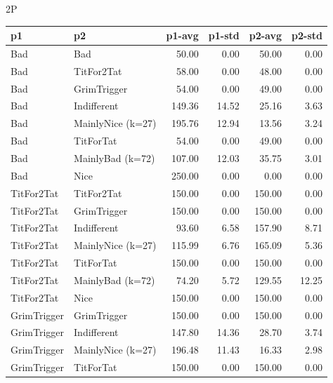 \documentclass[journal,a4paper,10pt,twoside]{IEEEtran} %
\begin{document}
2P
\begin{tabular}{llrrrr}\toprule
                   p1 &                 p2 &  p1-avg &  p1-std &  p2-avg &  p2-std \\ \midrule
                  Bad &                Bad &   50.00 &    0.00 &   50.00 &    0.00 \\
                  Bad &         TitFor2Tat &   58.00 &    0.00 &   48.00 &    0.00 \\
                  Bad &        GrimTrigger &   54.00 &    0.00 &   49.00 &    0.00 \\
                  Bad &        Indifferent &  149.36 &   14.52 &   25.16 &    3.63 \\
                  Bad &  MainlyNice (k=27) &  195.76 &   12.94 &   13.56 &    3.24 \\
                  Bad &          TitForTat &   54.00 &    0.00 &   49.00 &    0.00 \\
                  Bad &   MainlyBad (k=72) &  107.00 &   12.03 &   35.75 &    3.01 \\
                  Bad &               Nice &  250.00 &    0.00 &    0.00 &    0.00 \\
           TitFor2Tat &         TitFor2Tat &  150.00 &    0.00 &  150.00 &    0.00 \\
           TitFor2Tat &        GrimTrigger &  150.00 &    0.00 &  150.00 &    0.00 \\
           TitFor2Tat &        Indifferent &   93.60 &    6.58 &  157.90 &    8.71 \\
           TitFor2Tat &  MainlyNice (k=27) &  115.99 &    6.76 &  165.09 &    5.36 \\
           TitFor2Tat &          TitForTat &  150.00 &    0.00 &  150.00 &    0.00 \\
           TitFor2Tat &   MainlyBad (k=72) &   74.20 &    5.72 &  129.55 &   12.25 \\
           TitFor2Tat &               Nice &  150.00 &    0.00 &  150.00 &    0.00 \\
          GrimTrigger &        GrimTrigger &  150.00 &    0.00 &  150.00 &    0.00 \\
          GrimTrigger &        Indifferent &  147.80 &   14.36 &   28.70 &    3.74 \\
          GrimTrigger &  MainlyNice (k=27) &  196.48 &   11.43 &   16.33 &    2.98 \\
          GrimTrigger &          TitForTat &  150.00 &    0.00 &  150.00 &    0.00 \\

\end{tabular}
\end{document}
